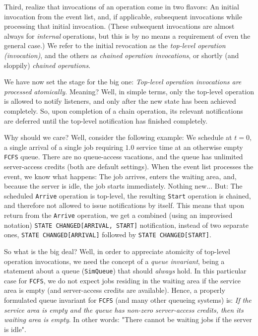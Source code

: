 Third, realize that invocations of an operation
  come in two flavors: An initial invocation
  from the event list, and, if applicable, subsequent
  invocations while processing that
  initial invocation.
(These subsequent invocations are almost always for {\em internal\/}
  operations, but this is by no means a requirement of even the general case.)
We refer to the initial revocation as the {\em top-level operation (invocation)},
  and the others as {\em chained operation invocations},
  or shortly (and sloppily) {\em chained operations}.

We have now set the stage for the big one:
  {\em Top-level operation invocations are processed atomically.}
Meaning? Well, in simple terms, only the top-level operation
  is allowed to notify listeners,
  and only after the new state has been achieved completely.
So, upon completion of a chain operation,
  its relevant notifications are deferred until
  the top-level notification has finished completely.

Why should we care? Well, consider the following example:
  We schedule at $t=0$, a single arrival of a single job
  requiring $1.0$ service time
  at an
  otherwise empty \lstinline|FCFS| queue.
There are no queue-access vacations,
  and the queue has unlimited
  server-access credits
  (both are default settings).
When the event list processes the event,
  we know what happens:
  The job arrives,
  enters the waiting area,
  and, because the server is idle,
  the job starts immediately.
Nothing new...
But: The scheduled \lstinline|Arrive| operation
  is top-level, the resulting \lstinline|Start| operation
  is chained, and therefore not allowed to issue notifications
  by itself.
This means that upon return from the \lstinline|Arrive| operation,
  we get a combined (using an improvised notation)
  \lstinline|STATE CHANGED[ARRIVAL, START]| notification,
  instead of two separate ones,
  \lstinline|STATE CHANGED[ARRIVAL]|
  followed by \lstinline|STATE CHANGED[START]|.

So what is the big deal?
Well, in order to appreciate atomicity of top-level operation invocations,
  we need the concept of a {\em queue invariant},
  being a statement about a queue (\lstinline|SimQueue|)
  that should {\em always\/} hold.
In this particular case for \lstinline|FCFS|,
  we do not expect jobs residing in the waiting area
  if the service area is empty
  (and server-access credits are available).
Hence, a properly formulated queue invariant
  for \lstinline|FCFS| (and many other queueing systems) is:
  {\em If the service area is empty and the queue has non-zero
       server-access credits, then its waiting area is empty}.
In other words: "There cannot be waiting jobs if the server is idle".

